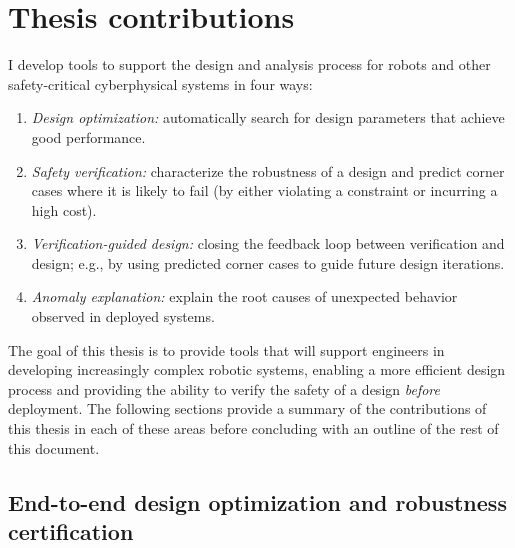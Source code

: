 
\section{Thesis contributions}

I develop tools to support the design and analysis process for robots and other safety-critical cyberphysical systems in four ways:
\begin{enumerate}
    \item \textit{Design optimization:} automatically search for design parameters that achieve good performance.
    \item \textit{Safety verification:} characterize the robustness of a design and predict corner cases where it is likely to fail (by either violating a constraint or incurring a high cost).
    \item \textit{Verification-guided design:} closing the feedback loop between verification and design; e.g., by using predicted corner cases to guide future design iterations.
    \item \textit{Anomaly explanation:} explain the root causes of unexpected behavior observed in deployed systems.
\end{enumerate}
%
The goal of this thesis is to provide tools that will support engineers in developing increasingly complex robotic systems, enabling a more efficient design process and providing the ability to verify the safety of a design \textit{before} deployment. The following sections provide a summary of the contributions of this thesis in each of these areas before concluding with an outline of the rest of this document.

\subsection{End-to-end design optimization and robustness certification}

